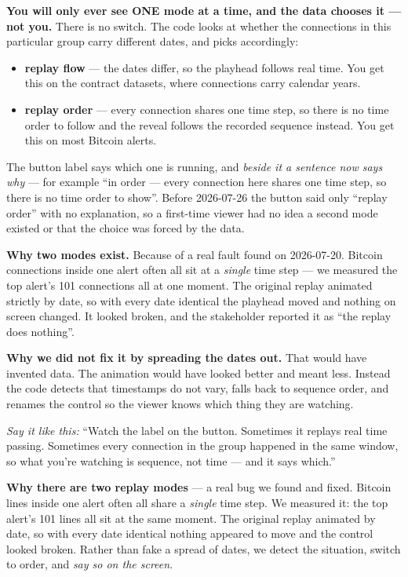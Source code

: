\documentclass[11pt,a4paper]{article}
\newcommand{\aloud}[1]{\par\smallskip\noindent\textit{\textcolor{accent}{Say
it like this:}} ``#1''\par\smallskip}
\begin{document}
\textbf{You will only ever see ONE mode at a time, and the data chooses it ---
not you.} There is no switch. The code looks at whether the connections in this
particular group carry different dates, and picks accordingly:

\begin{itemize}
  \item \textbf{replay flow} --- the dates differ, so the playhead follows real
        time. You get this on the contract datasets, where connections carry
        calendar years.
  \item \textbf{replay order} --- every connection shares one time step, so
        there is no time order to follow and the reveal follows the recorded
        sequence instead. You get this on most Bitcoin alerts.
\end{itemize}

The button label says which one is running, and \emph{beside it a sentence now
says why} --- for example ``in order --- every connection here shares one time
step, so there is no time order to show''. Before 2026-07-26 the button said only
``replay order'' with no explanation, so a first-time viewer had no idea a second
mode existed or that the choice was forced by the data.

\textbf{Why two modes exist.} Because of a real fault found on 2026-07-20.
Bitcoin connections inside one alert often all sit at a \emph{single} time step
--- we measured the top alert's 101 connections all at one moment. The original
replay animated strictly by date, so with every date identical the playhead
moved and nothing on screen changed. It looked broken, and the stakeholder
reported it as ``the replay does nothing''.

\textbf{Why we did not fix it by spreading the dates out.} That would have
invented data. The animation would have looked better and meant less. Instead
the code detects that timestamps do not vary, falls back to sequence order, and
renames the control so the viewer knows which thing they are watching.

\aloud{Watch the label on the button. Sometimes it replays real time passing.
Sometimes every connection in the group happened in the same window, so what
you're watching is sequence, not time --- and it says which.}

\begin{plain}
\textbf{Why there are two replay modes} --- a real bug we found and fixed. Bitcoin
lines inside one alert often all share a \emph{single} time step. We measured it:
the top alert's 101 lines all sit at the same moment. The original replay
animated by date, so with every date identical nothing appeared to move and the
control looked broken. Rather than fake a spread of dates, we detect the
situation, switch to order, and \emph{say so on the screen}.
\end{plain}
\end{document}
